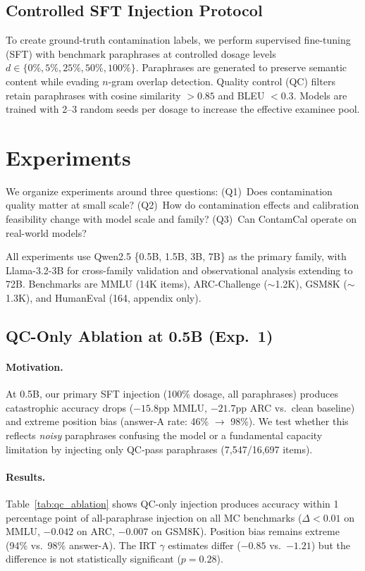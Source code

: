 \documentclass[11pt,a4paper]{article}
\newcommand{\gam}{\gamma}
\begin{document}
\subsection{Controlled SFT Injection Protocol}
\label{sec:sft}

To create ground-truth contamination labels, we perform supervised fine-tuning (SFT) with benchmark paraphrases at controlled dosage levels $d \in \{0\%, 5\%, 25\%, 50\%, 100\%\}$.
Paraphrases are generated to preserve semantic content while evading $n$-gram overlap detection.
Quality control (QC) filters retain paraphrases with cosine similarity $> 0.85$ and BLEU $< 0.3$.
Models are trained with 2--3 random seeds per dosage to increase the effective examinee pool.

\section{Experiments}
\label{sec:experiments}

We organize experiments around three questions:
(Q1)~Does contamination quality matter at small scale?
(Q2)~How do contamination effects and calibration feasibility change with model scale and family?
(Q3)~Can ContamCal operate on real-world models?

All experiments use Qwen2.5 \{0.5B, 1.5B, 3B, 7B\} as the primary family, with Llama-3.2-3B for cross-family validation and observational analysis extending to 72B.
Benchmarks are MMLU (14K items), ARC-Challenge ($\sim$1.2K), GSM8K ($\sim$1.3K), and HumanEval (164, appendix only).

\subsection{QC-Only Ablation at 0.5B (Exp.~1)}
\label{sec:exp_qc}

\paragraph{Motivation.}
At 0.5B, our primary SFT injection (100\% dosage, all paraphrases) produces catastrophic accuracy drops ($-15.8$pp MMLU, $-21.7$pp ARC vs.\ clean baseline) and extreme position bias (answer-A rate: 46\% $\to$ 98\%).
We test whether this reflects \emph{noisy} paraphrases confusing the model or a fundamental capacity limitation by injecting only QC-pass paraphrases (7,547/16,697 items).

\paragraph{Results.}
Table~\ref{tab:qc_ablation} shows QC-only injection produces accuracy within 1 percentage point of all-paraphrase injection on all MC benchmarks ($\Delta < 0.01$ on MMLU, $-0.042$ on ARC, $-0.007$ on GSM8K).
Position bias remains extreme (94\% vs.\ 98\% answer-A).
The IRT $\gam$ estimates differ ($-0.85$ vs.\ $-1.21$) but the difference is not statistically significant ($p = 0.28$).
\end{document}
